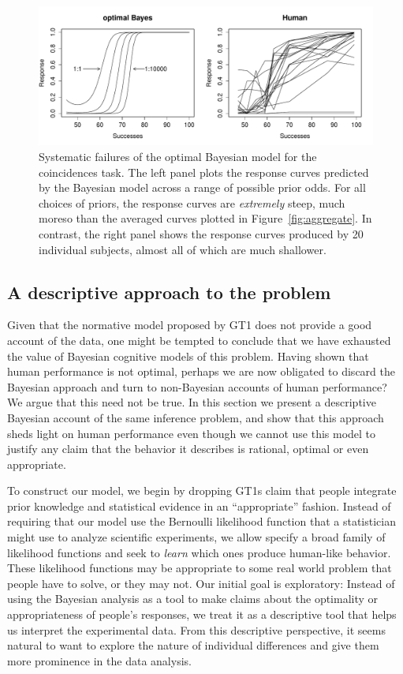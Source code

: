 \documentclass[doc,floatsintext]{apa6}
\begin{document}
\begin{figure}[t]
	\centering
	\includegraphics[width=1\textwidth]{coincidences_figures/nonoptimal.pdf}
	\caption{Systematic failures of the optimal Bayesian model for the coincidences task. The left panel plots the response curves predicted by the Bayesian model across a range of possible prior odds. For all choices of priors, the response curves are {\it extremely} steep, much moreso than the averaged curves plotted in Figure~\protect\ref{fig:aggregate}. In contrast, the right panel shows the response curves produced by 20 individual subjects, almost all of which are much shallower. }
	\label{fig:nonoptimal}
\end{figure}



\subsection*{A descriptive approach to the problem}

Given that the normative model proposed by GT1 does not provide a good account of the data, one might be tempted to conclude that we have exhausted the value of Bayesian cognitive models of this problem. Having shown that human performance is not optimal, perhaps we are now obligated to discard the Bayesian approach and turn to non-Bayesian accounts of human performance? We argue that this need not be true. In this section we present a descriptive Bayesian account of the same inference problem, and show that this approach sheds light on human performance even though we cannot use this model to justify any claim that the behavior it describes is rational, optimal or even appropriate.

To construct our model, we begin by dropping GT1s claim that people integrate prior knowledge and statistical evidence in an ``appropriate'' fashion. Instead of requiring that our model use the Bernoulli likelihood function that a statistician might use to analyze scientific experiments, we allow specify a broad family of likelihood functions and seek to {\it learn} which ones produce human-like behavior. These likelihood functions may be appropriate to some real world problem that people have to solve, or they may not. Our initial goal is exploratory: Instead of using the Bayesian analysis as a tool to make claims about the optimality or appropriateness of people's responses, we treat it as a descriptive tool that helps us interpret the experimental data. From this descriptive perspective, it seems natural to want to explore the nature of individual differences and give them more prominence in the data analysis.
\end{document}
